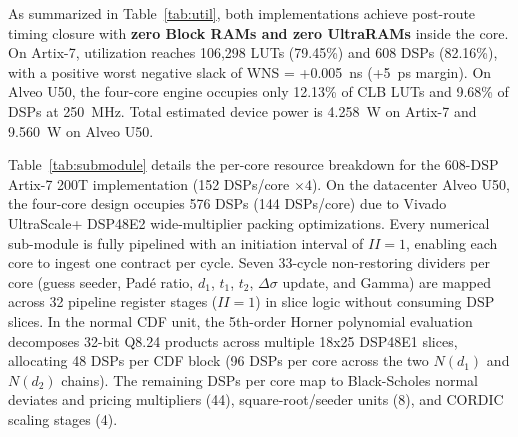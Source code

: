 \documentclass[sigconf,anonymous,review]{acmart}
\begin{document}
As summarized in Table~\ref{tab:util}, both implementations achieve post-route timing closure with \textbf{zero Block RAMs and zero UltraRAMs} inside the core. On Artix-7, utilization reaches 106,298 LUTs (79.45\%) and 608 DSPs (82.16\%), with a positive worst negative slack of WNS = +0.005~ns (+5~ps margin). On Alveo U50, the four-core engine occupies only 12.13\% of CLB LUTs and 9.68\% of DSPs at 250~MHz. Total estimated device power is 4.258~W on Artix-7 and 9.560~W on Alveo U50.

Table~\ref{tab:submodule} details the per-core resource breakdown for the 608-DSP Artix-7 200T implementation (152 DSPs/core $\times 4$). On the datacenter Alveo U50, the four-core design occupies 576 DSPs (144 DSPs/core) due to Vivado UltraScale+ DSP48E2 wide-multiplier packing optimizations. Every numerical sub-module is fully pipelined with an initiation interval of $II=1$, enabling each core to ingest one contract per cycle. Seven 33-cycle non-restoring dividers per core (guess seeder, Pad\'{e} ratio, $d_1$, $t_1$, $t_2$, $\Delta\sigma$ update, and Gamma) are mapped across 32 pipeline register stages ($II=1$) in slice logic without consuming DSP slices. In the normal CDF unit, the 5th-order Horner polynomial evaluation decomposes 32-bit Q8.24 products across multiple 18x25 DSP48E1 slices, allocating 48 DSPs per CDF block (96 DSPs per core across the two $N(d_1)$ and $N(d_2)$ chains). The remaining DSPs per core map to Black-Scholes normal deviates and pricing multipliers (44), square-root/seeder units (8), and CORDIC scaling stages (4).
\end{document}

